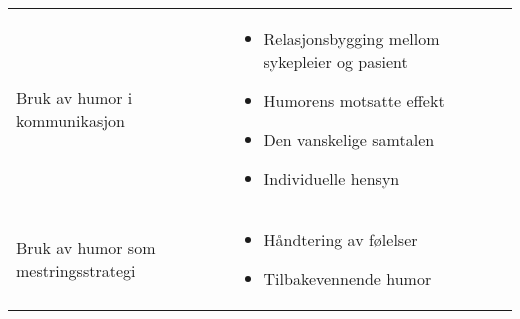 \begin{table}[h]
  \centering
  \begin{tabularx}{\textwidth}{lX}
    Bruk av humor i kommunikasjon &
      \begin{itemize}
        \item Relasjonsbygging mellom sykepleier og pasient
        \item Humorens motsatte effekt
        \item Den vanskelige samtalen
        \item Individuelle hensyn
      \end{itemize}
      \\
    Bruk av humor som mestringsstrategi &
      \begin{itemize}
        \item Håndtering av følelser
        \item Tilbakevennende humor
      \end{itemize}
  \end{tabularx}
\end{table}

